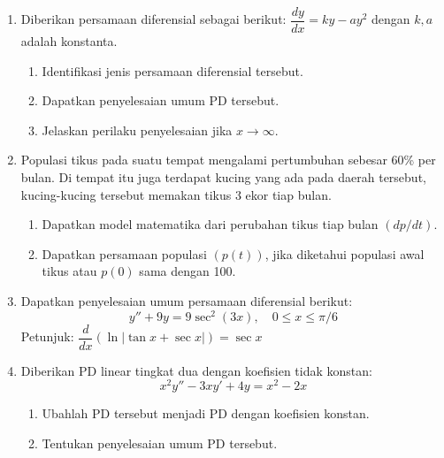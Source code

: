 \documentclass[10pt,openany,a4paper]{article}
\begin{document}
\begin{enumerate}
  \item Diberikan persamaan diferensial sebagai berikut:
        $
          \dfrac{dy}{dx} = ky - ay^2
        $
        dengan $k, a$ adalah konstanta.

        \begin{enumerate}
          \item Identifikasi jenis persamaan diferensial tersebut.
          \item Dapatkan penyelesaian umum PD tersebut.
          \item Jelaskan perilaku penyelesaian jika $x\to \infty$.
        \end{enumerate}

  \item Populasi tikus pada suatu tempat mengalami pertumbuhan sebesar 60\% per bulan. Di tempat itu juga terdapat kucing yang ada pada daerah tersebut, kucing-kucing tersebut memakan tikus 3 ekor tiap bulan.

        \begin{enumerate}
          \item Dapatkan model matematika dari perubahan tikus tiap bulan $(dp/dt)$.
          \item Dapatkan persamaan populasi $(p(t))$, jika diketahui populasi awal tikus atau $p(0)$ sama dengan 100.
        \end{enumerate}

  \item Dapatkan penyelesaian umum persamaan diferensial berikut:
        \[
          y'' + 9y = 9 \sec^2(3x), \quad 0 \le x \le \pi/6
        \]
        Petunjuk:
        $
          \dfrac{d}{dx}(\ln|\tan x+\sec x|) = \sec x
        $

  \item Diberikan PD linear tingkat dua dengan koefisien tidak konstan:
        \[
          x^2y'' - 3xy' + 4y = x^2-2x
        \]

        \begin{enumerate}
          \item Ubahlah PD tersebut menjadi PD dengan koefisien konstan.
          \item Tentukan penyelesaian umum PD tersebut.
        \end{enumerate}
\end{enumerate}
\end{document}

